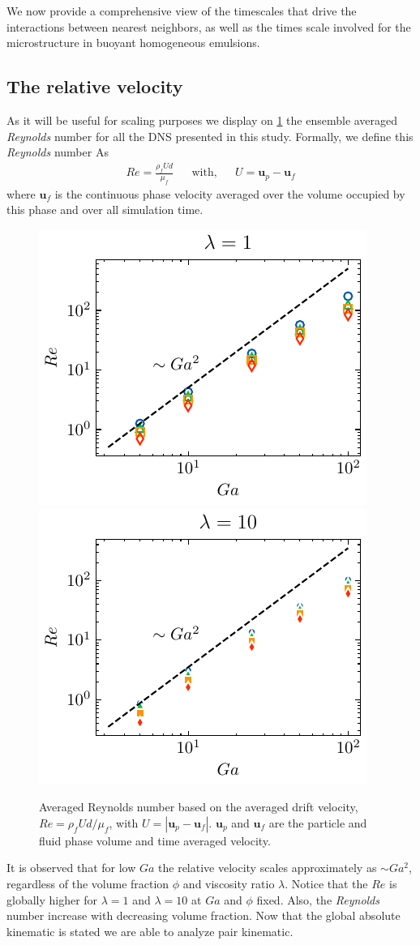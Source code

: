 We now provide a comprehensive view of the timescales that drive the interactions between nearest neighbors, as well as the times scale involved for the microstructure in buoyant homogeneous emulsions.

\subsection{The relative velocity}

As it will be useful for scaling purposes we display on \ref{fig:Reall} the ensemble averaged \textit{Reynolds} number for all the DNS presented in this study.
Formally, we define this \textit{Reynolds} number As
\begin{align*}
    Re = \frac{\rho_f U d}{\mu_f} && \text{with}, && U = \textbf{u}_p - \textbf{u}_f
\end{align*}
where $\textbf{u}_f$ is the continuous phase velocity averaged over the volume occupied by this phase and over all simulation time. 
\begin{figure}[h!]
    \centering
    \includegraphics[height = 0.3\textwidth]{image/HOMOGENEOUS_NEW/CA/Re_l_1.pdf}
    \includegraphics[height = 0.3\textwidth]{image/HOMOGENEOUS_NEW/CA/Re_l_10.pdf}
    \caption{
        Averaged Reynolds number based on the averaged drift velocity, $Re = \rho_fU d /\mu_f$, with $U = |\textbf{u}_p - \textbf{u}_f|$.
        $\textbf{u}_p$ and $\textbf{u}_f$ are the particle and fluid phase volume and time averaged velocity.
    }
    \label{fig:Reall}
\end{figure}
It is observed that for low $Ga$ the relative velocity scales approximately as $\sim Ga^2$, regardless of the volume fraction $\phi$ and viscosity ratio $\lambda$. 
Notice that the $Re$ is globally higher for $\lambda  =1$ and $\lambda = 10$ at $Ga$ and $\phi$ fixed. 
Also, the \textit{Reynolds} number increase with decreasing volume fraction. 
Now that the global absolute kinematic is stated we are able to analyze pair kinematic. 

